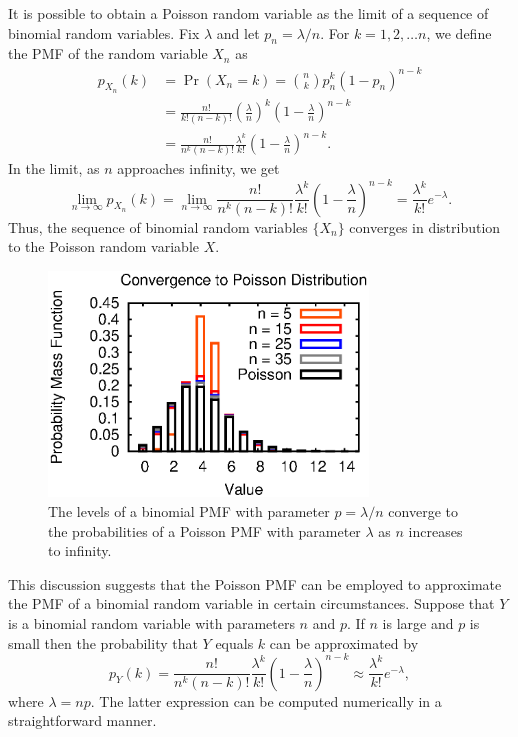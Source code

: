 It is possible to obtain a Poisson random variable as the limit of a sequence of binomial random variables.
Fix $\lambda$ and let $p_n = \lambda/n$.
For $k = 1, 2, \ldots n$, we define the PMF of the random variable $X_n$ as
\begin{equation*}
\begin{split}
p_{X_n} (k) &= \Pr (X_n = k)
= \binom{n}{k} p_n^k (1-p_n)^{n-k} \\
&= \frac{n!}{k!(n-k)!} \left( \frac{\lambda}{n} \right)^k
\left( 1 - \frac{\lambda}{n} \right)^{n-k} \\
&= \frac{n!}{n^k (n-k)!} \frac{\lambda^k}{k!}
\left( 1 - \frac{\lambda}{n} \right)^{n-k} .
\end{split}
\end{equation*}
In the limit, as $n$ approaches infinity, we get
\begin{equation*}
\lim_{n \rightarrow \infty} p_{X_n} (k)
= \lim_{n \rightarrow \infty} \frac{n!}{n^k (n-k)!} \frac{\lambda^k}{k!}
\left( 1 - \frac{\lambda}{n} \right)^{n-k}
= \frac{\lambda^k}{k!} e^{- \lambda} .
\end{equation*}
Thus, the sequence of binomial random variables $\{ X_n \}$ converges in distribution to the Poisson random variable $X$.

\begin{figure}[ht]
\begin{center}
\includegraphics[width=8.5cm]{Figures/5chapter/convergence_pmf}
\end{center}
\caption{The levels of a binomial PMF with parameter $p = \lambda/n$ converge to the probabilities of a Poisson PMF with parameter $\lambda$ as $n$ increases to infinity.}
\end{figure}

This discussion suggests that the Poisson PMF can be employed to approximate the PMF of a binomial random variable in certain circumstances.
Suppose that $Y$ is a binomial random variable with parameters $n$ and $p$.
If $n$ is large and $p$ is small then the probability that $Y$ equals $k$ can be approximated by
\begin{equation*}
p_{Y} (k) = \frac{n!}{n^k (n-k)!} \frac{\lambda^k}{k!}
\left( 1 - \frac{\lambda}{n} \right)^{n-k}
\approx \frac{\lambda^k}{k!} e^{- \lambda} ,
\end{equation*}
where $\lambda = n p$.
The latter expression can be computed numerically in a straightforward manner.

